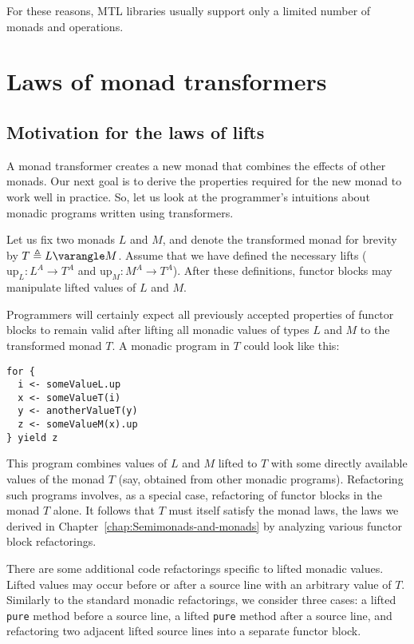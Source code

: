 For these reasons, MTL libraries usually support only a limited number
of monads and operations.

\section{Laws of monad transformers}

\subsection{Motivation for the laws of lifts}

A monad transformer creates a new monad that combines the effects
of other monads. Our next goal is to derive the properties required
for the new monad to work well in practice. So, let us look at the
programmer\textsf{'}s intuitions about monadic programs written using transformers.

Let us fix two monads $L$ and $M$, and denote the transformed monad
for brevity by $T\triangleq L\varangle M$. Assume that we have defined
the necessary lifts ($\text{up}_{L}:L^{A}\rightarrow T^{A}$ and $\text{up}_{M}:M^{A}\rightarrow T^{A}$).
After these definitions, functor blocks may manipulate lifted values
of $L$ and $M$. 

Programmers will certainly expect all previously accepted properties
of functor blocks to remain valid after lifting all monadic values
of types $L$ and $M$ to the transformed monad $T$. A monadic program
in $T$ could look like this:
\begin{lstlisting}
for {
  i <- someValueL.up
  x <- someValueT(i)
  y <- anotherValueT(y)
  z <- someValueM(x).up
} yield z
\end{lstlisting}
This program combines values of $L$ and $M$ lifted to $T$ with
some directly available values of the monad $T$ (say, obtained from
other monadic programs). Refactoring such programs involves, as a
special case, refactoring of functor blocks in the monad $T$ alone.
It follows that $T$ must itself satisfy the monad laws, \textemdash{}
the laws we derived in Chapter~\ref{chap:Semimonads-and-monads}
by analyzing various functor block refactorings. 

There are some additional code refactorings specific to lifted monadic
values. Lifted values may occur before or after a source line with
an arbitrary value of $T$. Similarly to the standard monadic refactorings,
we consider three cases: a lifted \lstinline!pure! method before
a source line, a lifted \lstinline!pure! method after a source line,
and refactoring two adjacent lifted source lines into a separate functor
block.

